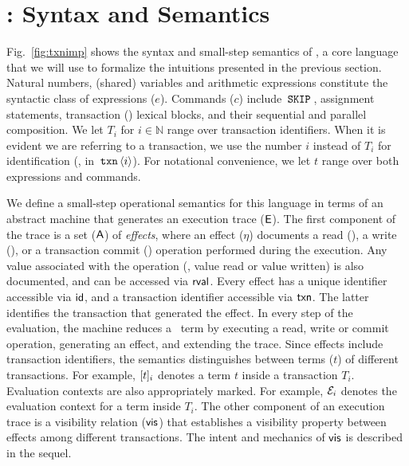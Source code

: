 \section{\txnimp: Syntax and Semantics}
\label{sec:opsem}

\label{sec:syntax}



Fig.~\ref{fig:txnimp} shows the syntax and small-step semantics of
\txnimp, a core language that we will use to formalize the intuitions
presented in the previous section. Natural numbers, (shared) variables
and arithmetic expressions constitute the syntactic class of
expressions ($e$).  Commands ($c$) include $\,{\tt SKIP}\,$, assignment
statements, transaction () lexical blocks, and their sequential
and parallel composition. We let $T_i$ for $i \in \mathbb{N}$ range
over transaction identifiers. When it is evident we are referring to a
transaction, we use the number $i$ instead of $T_i$ for identification
(\eg, in $\,{\tt txn}\,\langle i \rangle$). For notational convenience, we
let $t$ range over both expressions and commands.

We define a small-step operational semantics for this language in
terms of an abstract machine that generates an execution trace
($\textsf{E}$). The first component of the trace is a set ($\textsf{A}$) of
\emph{effects}, where an effect ($\eta$) documents a read (),
a write (), or a transaction commit () operation
performed during the execution. Any value associated with the
operation (\eg, value read or value written) is also documented, and
can be accessed via $\textsf{rval}$. Every effect has a unique identifier
accessible via $\textsf{id}$, and a transaction identifier accessible via
$\textsf{txn}$.  The latter identifies the transaction that generated the
effect. In every step of the evaluation, the machine reduces a \txnimp\
term by executing a read, write or commit operation, generating an
effect, and extending the trace. Since effects include transaction
identifiers, the semantics distinguishes between terms ($t$) of
different transactions. For example, $\lbrack t \rbrack_i$ denotes a term $t$
inside a transaction $T_i$.  Evaluation contexts are also
appropriately marked. For example, $\mathcal{E}_i$ denotes the evaluation
context for a term inside $T_i$. The other component of an execution
trace is a visibility relation ($\textsf{vis}$) that establishes a visibility
property between effects among different transactions. The intent and
mechanics of $\textsf{vis}$ is described in the sequel.

